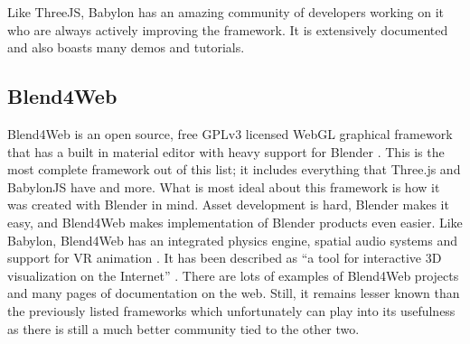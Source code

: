 Like ThreeJS, Babylon has an amazing community of developers working on it who are always actively improving the framework. It is extensively documented and also boasts many demos and tutorials.

\subsection{Blend4Web}
Blend4Web is an open source, free GPLv3 licensed WebGL graphical framework that has a built in material editor with heavy support for Blender \cite{r11}. This is the most complete framework out of this list; it includes everything that Three.js and BabylonJS have and more. What is most ideal about this framework is how it was created with Blender in mind. Asset development is hard, Blender makes it easy, and Blend4Web makes implementation of Blender products even easier. 
Like Babylon, Blend4Web has an integrated physics engine, spatial audio systems and support for VR animation \cite{r11}. It has been described as “a tool for interactive 3D visualization on the Internet” \cite{r11}. There are lots of examples of Blend4Web projects and many pages of documentation on the web. Still, it remains lesser known than the previously listed frameworks which unfortunately can play into its usefulness as there is still a much better community tied to the other two.